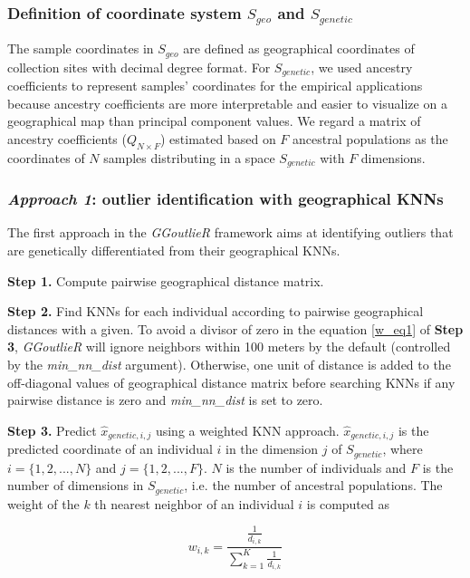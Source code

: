 \documentclass[11pt]{article}
\begin{document}
\subsubsection*{Definition of coordinate system $S_{geo}$ and $S_{genetic}$}

The sample coordinates in $S_{geo}$ are defined as geographical coordinates of collection sites with decimal degree format.
For $S_{genetic}$, we used ancestry coefficients \citep{pritchard2000inference} to represent samples' coordinates for the empirical applications because ancestry coefficients are more interpretable and easier to visualize on a geographical map than principal component values.
We regard a matrix of ancestry coefficients ($Q_{N\times F}$) estimated based on $F$ ancestral populations as the coordinates of $N$ samples distributing in a space $S_{genetic}$ with $F$ dimensions.

\subsubsection*{\textit{Approach 1}: outlier identification with geographical KNNs}

The first approach in the \textit{GGoutlieR} framework aims at identifying outliers that are genetically differentiated from their geographical KNNs.

\textbf{Step 1.} Compute pairwise geographical distance matrix. 

\textbf{Step 2.} Find KNNs for each individual according to pairwise geographical distances with a given.
To avoid a divisor of zero in the equation \ref{w_eq1} of \textbf{Step 3}, \textit{GGoutlieR} will ignore neighbors within 100 meters by the default (controlled by the \textit{min\_nn\_dist} argument).
Otherwise, one unit of distance is added to the off-diagonal values of geographical distance matrix before searching KNNs if any pairwise distance is zero and \textit{min\_nn\_dist} is set to zero.

\textbf{Step 3.} Predict $\hat{x}_{genetic,i,j}$ using a weighted KNN approach.
$\hat{x}_{genetic,i,j}$ is the predicted coordinate of an individual $i$ in the dimension $j$ of $S_{genetic}$, where $i = \{1,2,...,N\}$ and $j = \{1,2,...,F\}$. $N$ is the number of individuals and $F$ is the number of dimensions in $S_{genetic}$, i.e. the number of ancestral populations. 
The weight of the $k$ th nearest neighbor of an individual $i$ is computed as

\begin{equation} \label{w_eq1}
w_{i,k}=\frac{\frac{1}{d_{i,k}}}{\sum_{k=1}^{K} \frac{1}{d_{i,k}}}
\end{equation}
\end{document}
